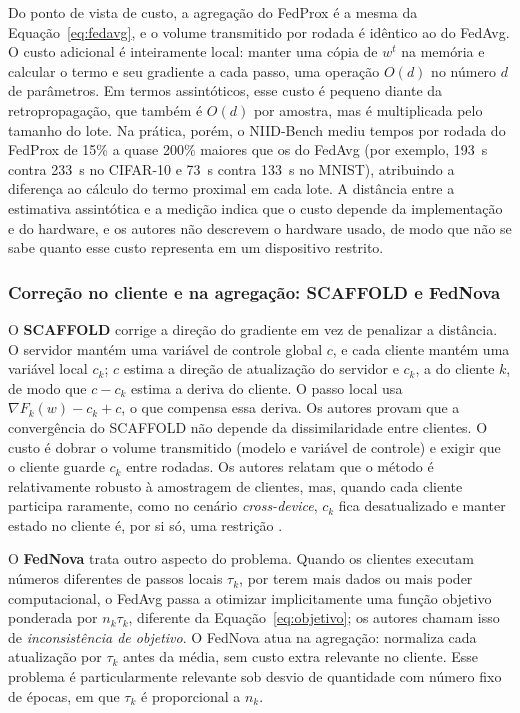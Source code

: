 Do ponto de vista de custo, a agregação do FedProx é a mesma da Equação~\eqref{eq:fedavg}, e o volume transmitido por rodada é idêntico ao do FedAvg. O custo adicional é inteiramente local: manter uma cópia de $w^t$ na memória e calcular o termo e seu gradiente a cada passo, uma operação $O(d)$ no número $d$ de parâmetros. Em termos assintóticos, esse custo é pequeno diante da retropropagação, que também é $O(d)$ por amostra, mas é multiplicada pelo tamanho do lote. Na prática, porém, o NIID-Bench \citep{li2022niidbench} mediu tempos por rodada do FedProx de 15\% a quase 200\% maiores que os do FedAvg (por exemplo, 193~s contra 233~s no CIFAR-10 e 73~s contra 133~s no MNIST), atribuindo a diferença ao cálculo do termo proximal em cada lote. A distância entre a estimativa assintótica e a medição indica que o custo depende da implementação e do hardware, e os autores não descrevem o hardware usado, de modo que não se sabe quanto esse custo representa em um dispositivo restrito.

\subsubsection{Correção no cliente e na agregação: SCAFFOLD e FedNova}

O \textbf{SCAFFOLD} \citep{karimireddy2020scaffold} corrige a direção do gradiente em vez de penalizar a distância. O servidor mantém uma variável de controle global $c$, e cada cliente mantém uma variável local $c_k$; $c$ estima a direção de atualização do servidor e $c_k$, a do cliente $k$, de modo que $c - c_k$ estima a deriva do cliente. O passo local usa $\nabla F_k(w) - c_k + c$, o que compensa essa deriva. Os autores provam que a convergência do SCAFFOLD não depende da dissimilaridade entre clientes. O custo é dobrar o volume transmitido (modelo e variável de controle) e exigir que o cliente guarde $c_k$ entre rodadas. Os autores relatam que o método é relativamente robusto à amostragem de clientes, mas, quando cada cliente participa raramente, como no cenário \textit{cross-device}, $c_k$ fica desatualizado e manter estado no cliente é, por si só, uma restrição \citep{kairouz2021advances}.

O \textbf{FedNova} \citep{wang2020fednova} trata outro aspecto do problema. Quando os clientes executam números diferentes de passos locais $\tau_k$, por terem mais dados ou mais poder computacional, o FedAvg passa a otimizar implicitamente uma função objetivo ponderada por $n_k \tau_k$, diferente da Equação~\eqref{eq:objetivo}; os autores chamam isso de \emph{inconsistência de objetivo}. O FedNova atua na agregação: normaliza cada atualização por $\tau_k$ antes da média, sem custo extra relevante no cliente. Esse problema é particularmente relevante sob desvio de quantidade com número fixo de épocas, em que $\tau_k$ é proporcional a $n_k$.

